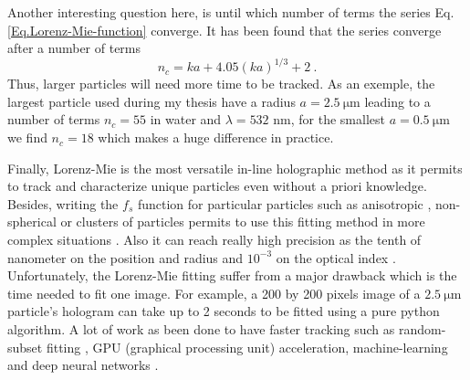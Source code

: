 Another interesting question here, is until which number of terms the series Eq.\ref{Eq.Lorenz-Mie-function} converge. It has been found \cite{lentz_generating_1976} that the series converge after a number of terms
\begin{equation}
	n_c = k a + 4.05 (k a)^{1/3} + 2 ~.
\end{equation}
Thus, larger particles will need more time to be tracked. As an exemple, the largest particle used during my thesis have a radius $a = 2.5 ~ \mathrm{\mu m}$ leading to a number of terms $ n_c = 55$ in water and $\lambda = 532$ nm, for the smallest $a = 0.5 ~ \mathrm{\mu m}$ we find $n_c = 18$ which makes a huge difference in practice.

Finally, Lorenz-Mie is the most versatile in-line holographic method as it permits to track and characterize unique particles even without a priori knowledge. Besides, writing the $f_s$ function for particular particles such as anisotropic \cite{fung_holographic_2013}, non-spherical \cite{wang_using_2014} or clusters \cite{fung_holographic_2013, perry_real-space_2013} of particles permits to use this fitting method in more complex situations . Also it can reach really high precision as the tenth of nanometer on the position and radius and $10^{-3}$ on the optical index \cite{lee_characterizing_2007}. Unfortunately, the Lorenz-Mie fitting suffer from a major drawback which is the time needed to fit one image. For example, a 200 by 200 pixels image of a $2.5 ~ \mathrm{\mu m}$ particle's hologram can take up to 2 seconds to be fitted using a pure python algorithm. A lot of work as been done to have faster tracking such as random-subset fitting \cite{dimiduk_random-subset_2014}, GPU (graphical processing unit) acceleration, machine-learning \cite{yevick_machine-learning_2014, hannel_machine-learning_2018} and deep neural networks \cite{altman_catch_2020}.


